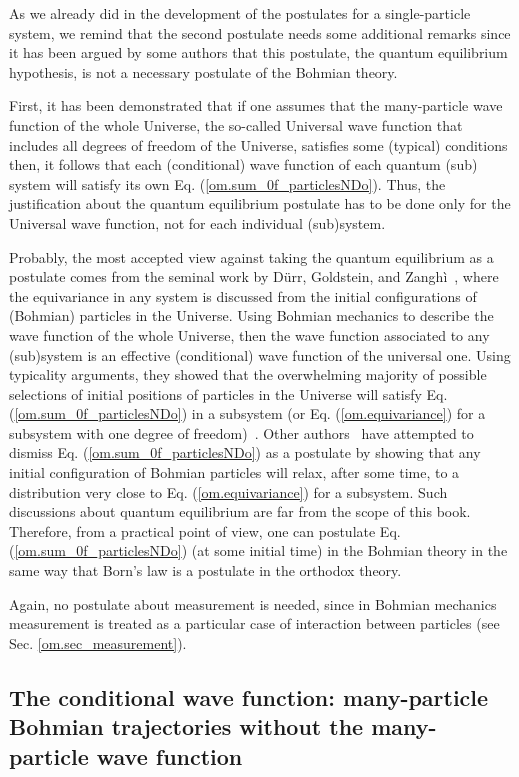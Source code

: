 \documentclass[nofootinbib, secnumarabic, amsmath, nobibnotes,10pt,aps,pra]{revtex4-1}
\newcommand{\sref}[1]{Sec. \ref{#1}}
\newcommand{\eref}[1]{Eq. (\ref{#1})}
\begin{document}
As we  already did in the development of the postulates for a single-particle system, we remind that the second postulate needs some additional remarks since it has been argued by some authors that this postulate, the quantum equilibrium hypothesis, is not a necessary postulate of the Bohmian theory. 

First, it has been demonstrated that if one assumes that the many-particle wave function of the whole Universe, the so-called Universal wave function that includes all degrees of freedom of the Universe, satisfies some (typical) conditions then, it follows that each (conditional) wave function of each quantum (sub) system will satisfy its own \eref{om.sum_0f_particlesNDo}. Thus, the justification about the quantum equilibrium postulate has to be done only for the Universal wave function, not for each individual (sub)system.  

Probably, the most accepted view against taking the quantum equilibrium as a postulate comes from the seminal work by D\"urr, Goldstein, and Zangh\`i~\cite{om.extra9,om.llibreph}, where the equivariance in any system is discussed from the initial configurations of (Bohmian) particles in the Universe.
Using Bohmian mechanics to describe the wave function of the whole Universe, then the wave function associated to any (sub)system is an effective (conditional) wave function of the universal one. Using typicality arguments, they showed that the overwhelming majority of possible selections of initial positions of particles in the Universe will satisfy  \eref{om.sum_0f_particlesNDo} in a subsystem (or \eref{om.equivariance} for a subsystem with one degree of freedom)~\cite{om.extra9,om.llibreph}.
Other authors~\cite{om.towler2011} have attempted to dismiss \eref{om.sum_0f_particlesNDo} as a postulate by showing that any initial configuration of Bohmian particles will relax, after some time, to a distribution very close to \eref{om.equivariance} for a subsystem.
Such discussions about quantum equilibrium are far from the scope of this book. Therefore, from a practical point of view, one can postulate \eref{om.sum_0f_particlesNDo} (at some initial time) in the Bohmian theory in the same way that Born's law is a postulate in the orthodox theory.
 

Again, no postulate about measurement is needed, since in Bohmian
mechanics measurement is treated as a particular case of interaction between particles (see \sref{om.sec_measurement}).

\subsection{The conditional wave function: many-particle Bohmian trajectories without the many-particle wave function}\label{om.sec_many.6}
\end{document}
